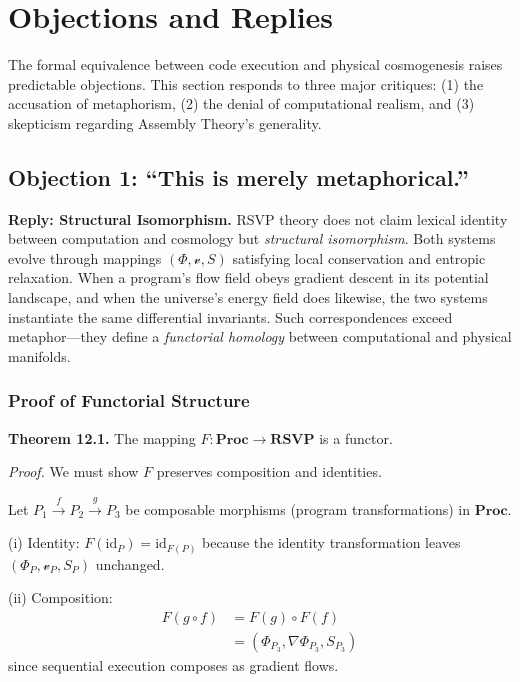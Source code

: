 \documentclass[12pt,a4paper]{article}
\theoremstyle{plain}
\theoremstyle{definition}
\theoremstyle{remark}
\newcommand{\Phifield}{\Phi}
\newcommand{\vfield}{\mathcal{v}}
\newcommand{\Sfield}{S}
\begin{document}
\section{Objections and Replies}
\label{sec:objections}

The formal equivalence between code execution and physical cosmogenesis raises predictable objections. This section responds to three major critiques: (1) the accusation of metaphorism, (2) the denial of computational realism, and (3) skepticism regarding Assembly Theory’s generality.

\subsection{Objection 1: “This is merely metaphorical.”}
\textbf{Reply: Structural Isomorphism.}
RSVP theory does not claim lexical identity between computation and cosmology but \emph{structural isomorphism}. Both systems evolve through mappings $(\Phifield,\vfield,\Sfield)$ satisfying local conservation and entropic relaxation. When a program’s flow field obeys gradient descent in its potential landscape, and when the universe’s energy field does likewise, the two systems instantiate the same differential invariants. Such correspondences exceed metaphor—they define a \emph{functorial homology} between computational and physical manifolds.

\subsubsection{Proof of Functorial Structure}
\textbf{Theorem 12.1.} The mapping $F: \mathbf{Proc} \to \mathbf{RSVP}$ is a functor.

\textit{Proof.} We must show $F$ preserves composition and identities.

Let $P_1 \xrightarrow{f} P_2 \xrightarrow{g} P_3$ be composable morphisms (program transformations) in $\mathbf{Proc}$.

(i) Identity: $F(\text{id}_P) = \text{id}_{F(P)}$ because the identity transformation leaves $(\Phifield_P, \vfield_P, \Sfield_P)$ unchanged.

(ii) Composition:
\begin{align}
F(g \circ f) &= F(g) \circ F(f) \\
&= (\Phifield_{P_3}, \nabla\Phifield_{P_3}, \Sfield_{P_3})
\end{align}
since sequential execution composes as gradient flows.
\end{document}
